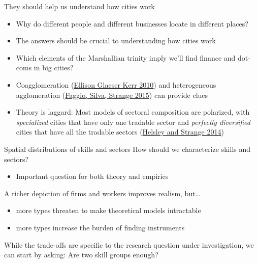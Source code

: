 \documentclass[10pt,notes=hide]{beamer}
\begin{document}
\begin{frame}{They should help us understand how cities work}
\begin{itemize}
	\item Why do different people and different businesses locate in different places?
	\item The answers should be crucial to understanding how cities work
	\item Which elements of the Marshallian trinity imply we'll find finance and dot-coms in big cities?
	\item Coagglomeration (\href{https://www.aeaweb.org/articles.php?doi=10.1257/aer.100.3.1195}{Ellison Glaeser Kerr 2010}) and heterogeneous agglomeration (\href{https://ideas.repec.org/p/ehl/lserod/58426.html}{Faggio, Silva, Strange 2015}) can provide clues
	\item Theory is laggard: Most models of sectoral composition are polarized, with \emph{specialized} cities that have only one tradable sector and \emph{perfectly diversified} cities that have all the tradable sectors (\href{http://www.jstor.org/stable/10.1086/676557}{Helsley and Strange 2014})
\end{itemize}
\end{frame}
\begin{frame}{Spatial distributions of skills and sectors}
How should we characterize skills and sectors?
\begin{itemize}
	\item Important question for both theory and empirics
\end{itemize}
A richer depiction of firms and workers improves realism, but\dots
\begin{itemize}
	\item more types threaten to make theoretical models intractable
	\item more types increase the burden of finding instruments
\end{itemize}
While the trade-offs are specific to the research question under investigation, we can start by asking: Are two skill groups enough?
\end{frame}
\end{document}

